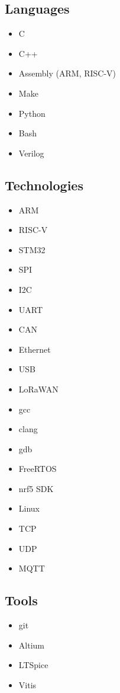 \documentclass[lighthipster]{styles}
\begin{document}
\begin{paracol}{2}
{\subsection*{Languages}
\vspace{-0.4cm}
\begin{multicols}{2}
    \begin{itemize}
        \item C
        \item C++
        \item Assembly (ARM, RISC-V)
        \item Make
        \item Python
        \item Bash
        \item Verilog
    \end{itemize}
\end{multicols}

\subsection*{Technologies}
\vspace{-0.4cm}
\begin{multicols}{2}
    \begin{itemize}
        \item ARM
        \item RISC-V
        \item STM32
        \item SPI
        \item I2C
        \item UART
        \item CAN
        \item Ethernet
        \item USB
        \item LoRaWAN
        \item gcc
        \item clang
        \item gdb
        \item FreeRTOS
        \item nrf5 SDK
        \item Linux
        \item TCP
        \item UDP
        \item MQTT
    \end{itemize}
\end{multicols}

\subsection*{Tools}
\vspace{-0.4cm}
\begin{multicols}{2}
    \begin{itemize}
        \item git
        \item Altium
        \item LTSpice
        \item Vitis
    \end{itemize}
\end{multicols}

}
\end{paracol}
\end{document}
